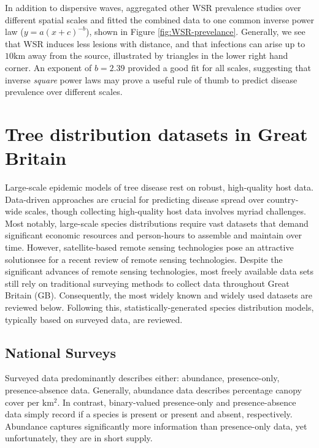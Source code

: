 In addition to dispersive waves, \cite{severns2019consequences} aggregated other WSR prevalence studies over different spatial 
scales and fitted the combined data to one common inverse power law ($y=a(x+c)^{-b}$), shown in Figure \ref{fig:WSR-prevelance}.
Generally, we see that WSR induces less lesions with distance, and that infections can arise up to $10\mathrm{km}$ away from the source,
illustrated by triangles in the lower right hand corner.
An exponent of $b=2.39$ provided a good fit for all scales, suggesting that inverse \textit{square} power laws may 
prove a useful rule of thumb to predict disease prevalence over different scales.

\newpage

\section{Tree distribution datasets in Great Britain}
\label{ch2:hostdata}

Large-scale epidemic models of tree disease rest on robust, high-quality host data.
Data-driven approaches are crucial for predicting disease spread over country-wide scales, 
though collecting high-quality host data involves myriad challenges. 
Most notably, large-scale species distributions require vast datasets that demand significant economic resources
and person-hours to assemble and maintain over time. 
However, satellite-based remote sensing technologies pose an attractive solution\textemdash see \cite{camarretta2020monitoring} for a recent review of remote sensing technologies.
Despite the significant advances of remote sensing technologies, most freely available data sets still rely on traditional surveying methods to collect data throughout Great Britain (GB).
Consequently, the most widely known and widely used datasets are reviewed below.
Following this, statistically-generated species distribution models, typically based on surveyed data, are reviewed.

\subsection{National Surveys}
\label{sec:nationa-surveyes}

Surveyed data predominantly describes either: abundance, presence-only, presence-absence data. 
Generally, abundance data describes percentage canopy cover per $\mathrm{km^2}$.
In contrast, binary-valued presence-only and presence-absence data simply record if a species is present or present and absent, respectively.
Abundance captures significantly more information than presence-only data, yet unfortunately, they are in short supply.

